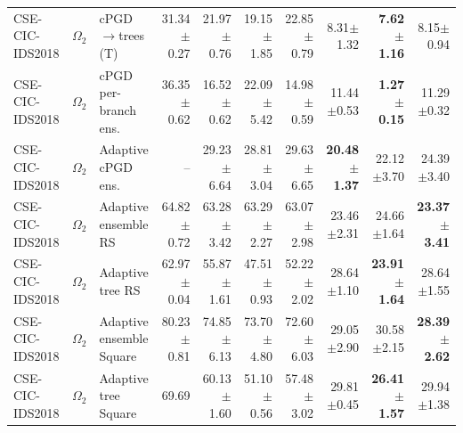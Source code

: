 \begin{tabular}{@{}lllrrrrrrr@{}}
CSE-CIC-IDS2018 & $\Omega_2$ & cPGD$\to$trees (T) & 31.34$\pm$0.27 & 21.97$\pm$0.76 & 19.15$\pm$1.85 & 22.85$\pm$0.79 & 8.31$\pm$1.32 & \textbf{7.62$\pm$1.16} & 8.15$\pm$0.94\\
CSE-CIC-IDS2018 & $\Omega_2$ & cPGD per-branch ens. & 36.35$\pm$0.62 & 16.52$\pm$0.62 & 22.09$\pm$5.42 & 14.98$\pm$0.59 & 11.44$\pm$0.53 & \textbf{1.27$\pm$0.15} & 11.29$\pm$0.32\\
CSE-CIC-IDS2018 & $\Omega_2$ & Adaptive cPGD ens. & -- & 29.23$\pm$6.64 & 28.81$\pm$3.04 & 29.63$\pm$6.65 & \textbf{20.48$\pm$1.37} & 22.12$\pm$3.70 & 24.39$\pm$3.40\\
CSE-CIC-IDS2018 & $\Omega_2$ & Adaptive ensemble RS & 64.82$\pm$0.72 & 63.28$\pm$3.42 & 63.29$\pm$2.27 & 63.07$\pm$2.98 & 23.46$\pm$2.31 & 24.66$\pm$1.64 & \textbf{23.37$\pm$3.41}\\
CSE-CIC-IDS2018 & $\Omega_2$ & Adaptive tree RS & 62.97$\pm$0.04 & 55.87$\pm$1.61 & 47.51$\pm$0.93 & 52.22$\pm$2.02 & 28.64$\pm$1.10 & \textbf{23.91$\pm$1.64} & 28.64$\pm$1.55\\
CSE-CIC-IDS2018 & $\Omega_2$ & Adaptive ensemble Square & 80.23$\pm$0.81 & 74.85$\pm$6.13 & 73.70$\pm$4.80 & 72.60$\pm$6.03 & 29.05$\pm$2.90 & 30.58$\pm$2.15 & \textbf{28.39$\pm$2.62}\\
CSE-CIC-IDS2018 & $\Omega_2$ & Adaptive tree Square & 69.69 & 60.13$\pm$1.60 & 51.10$\pm$0.56 & 57.48$\pm$3.02 & 29.81$\pm$0.45 & \textbf{26.41$\pm$1.57} & 29.94$\pm$1.38\\
\bottomrule
\end{tabular}
